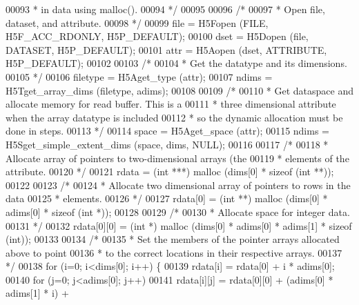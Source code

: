 \begin{DoxyCode}
00093 \textcolor{comment}{     * in data using malloc().}
00094 \textcolor{comment}{     */}
00095 
00096     \textcolor{comment}{/*}
00097 \textcolor{comment}{     * Open file, dataset, and attribute.}
00098 \textcolor{comment}{     */}
00099     file = H5Fopen (FILE, H5F\_ACC\_RDONLY, H5P\_DEFAULT);
00100     dset = H5Dopen (file, DATASET, H5P\_DEFAULT);
00101     attr = H5Aopen (dset, ATTRIBUTE, H5P\_DEFAULT);
00102 
00103     \textcolor{comment}{/*}
00104 \textcolor{comment}{     * Get the datatype and its dimensions.}
00105 \textcolor{comment}{     */}
00106     filetype = H5Aget\_type (attr);
00107     ndims = H5Tget\_array\_dims (filetype, adims);
00108 
00109     \textcolor{comment}{/*}
00110 \textcolor{comment}{     * Get dataspace and allocate memory for read buffer.  This is a}
00111 \textcolor{comment}{     * three dimensional attribute when the array datatype is included}
00112 \textcolor{comment}{     * so the dynamic allocation must be done in steps.}
00113 \textcolor{comment}{     */}
00114     space = H5Aget\_space (attr);
00115     ndims = H5Sget\_simple\_extent\_dims (space, dims, NULL);
00116 
00117     \textcolor{comment}{/*}
00118 \textcolor{comment}{     * Allocate array of pointers to two-dimensional arrays (the}
00119 \textcolor{comment}{     * elements of the attribute.}
00120 \textcolor{comment}{     */}
00121     rdata = (\textcolor{keywordtype}{int} ***) malloc (dims[0] * \textcolor{keyword}{sizeof} (\textcolor{keywordtype}{int} **));
00122 
00123     \textcolor{comment}{/*}
00124 \textcolor{comment}{     * Allocate two dimensional array of pointers to rows in the data}
00125 \textcolor{comment}{     * elements.}
00126 \textcolor{comment}{     */}
00127     rdata[0] = (\textcolor{keywordtype}{int} **) malloc (dims[0] * adims[0] * \textcolor{keyword}{sizeof} (\textcolor{keywordtype}{int} *));
00128 
00129     \textcolor{comment}{/*}
00130 \textcolor{comment}{     * Allocate space for integer data.}
00131 \textcolor{comment}{     */}
00132     rdata[0][0] = (\textcolor{keywordtype}{int} *) malloc (dims[0] * adims[0] * adims[1] * \textcolor{keyword}{sizeof} (\textcolor{keywordtype}{int}));
00133 
00134     \textcolor{comment}{/*}
00135 \textcolor{comment}{     * Set the members of the pointer arrays allocated above to point}
00136 \textcolor{comment}{     * to the correct locations in their respective arrays.}
00137 \textcolor{comment}{     */}
00138     \textcolor{keywordflow}{for} (i=0; i<dims[0]; i++) \{
00139         rdata[i] = rdata[0] + i * adims[0];
00140         \textcolor{keywordflow}{for} (j=0; j<adims[0]; j++)
00141             rdata[i][j] = rdata[0][0] + (adims[0] * adims[1] * i) +

\end{DoxyCode}
